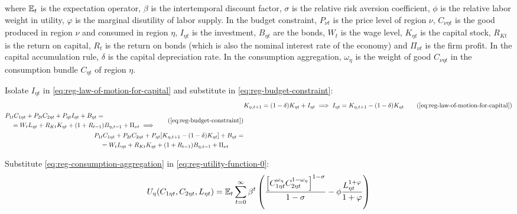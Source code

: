 \documentclass[
thesis.tex
]{subfiles}
\begin{document}
where ${\mathbb{E}_{t}}$ is the expectation operator, $\beta$ is the intertemporal discount factor, $\sigma$ is the relative risk aversion coefficient, $\phi$ is the relative labor weight in utility, $\varphi$ is the marginal disutility of labor supply. In the budget constraint, $P_{\nu t}$ is the price level of region $\nu$, $C_{\nu \eta t}$ is the good produced in region $\nu$ and consumed in region $\eta$, $I_{\eta t}$ is the investment, $B_{\eta t}$ are the bonds, $W_t$ is the wage level, $K_{\eta t}$ is the capital stock, $R_{Kt}$ is the return on capital, $R_t$ is the return on bonds (which is also the nominal interest rate of the economy) and $\Pi_{\nu t}$ is the firm profit. In the capital accumulation rule, $\delta$ is the capital depreciation rate. In the consumption aggregation, ${\omega_\eta}$ is the weight of good $C_{\nu \eta t}$ in the consumption bundle $C_{\eta t}$ of region $\eta$.

Isolate $I_{\eta t}$ in \ref{eq:reg-law-of-motion-for-capital} and substitute in \ref{eq:reg-budget-constraint}:
\begin{align}
	& K_{\eta, t+1} = (1-\delta)K_{\eta t} + I_{\eta t} \implies I_{\eta t} = K_{\eta, t+1} - (1-\delta)K_{\eta t} \tag{\ref{eq:reg-law-of-motion-for-capital}} \\
	\begin{split}
		& P_{1t} C_{1\eta t} + P_{2t} C_{2\eta t} + P_{\eta t} I_{\eta t} + B_{\eta t} = \\ & \quad = W_t L_{\eta t} + R_{Kt} K_{\eta t} + (1 + R_{t-1}) B_{\eta,t-1} + \Pi_{\nu t} \implies
	\end{split} \tag{\ref{eq:reg-budget-constraint}}
	\\
	\begin{split}
		& P_{1t} C_{1\eta t} + P_{2t} C_{2\eta t} + P_{\eta t} [ K_{\eta, t+1} - (1-\delta)K_{\eta t} ] + B_{\eta t} = \\ & \quad = W_t L_{\eta t} + R_{Kt} K_{\eta t} + (1 + R_{t-1}) B_{\eta,t-1} + \Pi_{\nu t}
	\end{split} \label{eq:reg-budget-constraint-2}
\end{align}

Substitute \ref{eq:reg-consumption-aggregation} in \ref{eq:reg-utility-function-0}:
\begin{align}
	U_{\eta}(C_{1\eta t}, C_{2\eta t}, L_{\eta t}) = {\mathbb{E}_{t}} \sum_{t=0}^{\infty} \beta^t \left( \frac{\left[ C_{1\eta t}^{\omega_{\eta}} C_{2\eta t}^{1-\omega_{\eta}} \right]^{1-\sigma}}{1-\sigma} - \phi \frac{L_{\eta t}^{1+\varphi}}{1+\varphi} \right) \label{eq:reg-utility-function}
\end{align}
\end{document}
